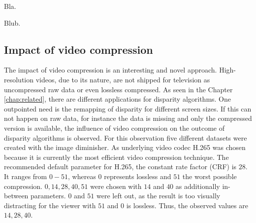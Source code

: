 \noindent Bla.

\begin{table}[h!]
\centering
{}
\caption[Result table for the impact of noise]{Result table for the impact of noise, focusing on PBMP$_{1px}$}
\end{table}

\noindent Blub.









\subsection{Impact of video compression}

The impact of video compression is an interesting and novel approach.
High-resolution videos, due to its nature, are not shipped for television as uncompressed raw data or even lossless compressed.
As seen in the Chapter \ref{chap:related}, there are different applications for disparity algorithms.
One outpointed need is the remapping of disparity for different screen sizes.
If this can not happen on raw data, for instance the data is missing and only the compressed version is available, the influence of video compression on the outcome of disparity algorithms is observed.
\newline\newline\noindent For this observation five different datasets were created with the image diminisher.
As underlying video codec H.265 was chosen because it is currently the most efficient video compression technique.
The recommended default parameter for H.265, the constant rate factor (CRF) is $28$.
It ranges from $0-51$, whereas $0$ represents lossless and $51$ the worst possible compression.
$0, 14, 28, 40, 51$ were chosen with $14$ and $40$ as additionally in-between parameters.
$0$ and $51$ were left out, as the result is too visually distracting for the viewer with $51$ and $0$ is lossless.
Thus, the observed values are $14, 28, 40$.










